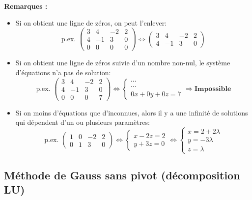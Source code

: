 \textbf{Remarques :}
\begin{itemize}
\item Si on obtient une ligne de zéros, on peut l'enlever:
\[\text{p.ex. }  \left(\begin{array}{ccc|c} 3 & 4 & -2 & 2 \\ 4 & -1 & 3 & 0 \\ 0 & 0 & 0 & 0 \end{array}\right) \Leftrightarrow  \left(\begin{array}{ccc|c} 3 & 4 & -2 & 2 \\ 4 & -1 & 3 & 0 \end{array}\right) \]
\item Si on obtient une ligne de zéros suivie d'un nombre non-nul, le système d'équations n'a pas de solution:
\[\text{p.ex. }  \left(\begin{array}{ccc|c} 3 & 4 & -2 & 2 \\ 4 & -1 & 3 & 0 \\ 0 & 0 & 0 & 7 \end{array}\right) \Leftrightarrow  \begin{cases} \cdots \\ \cdots \\ 0x + 0y + 0z = 7 \end{cases} \Rightarrow \textbf{Impossible} \]
\item Si on moins d'équations que d'inconnues, alors il y a une infinité de solutions qui dépendent d'un ou plusieurs paramètres:
\[\text{p.ex. }  \left(\begin{array}{ccc|c} 1 & 0 & -2 & 2 \\ 0 & 1 & 3 & 0 \end{array}\right) \Leftrightarrow  \begin{cases} x - 2z = 2 \\ y + 3z = 0 \end{cases} \Leftrightarrow  \begin{cases} x = 2 + 2\lambda \\ y = -3\lambda \\ z = \lambda \end{cases} \]
\end{itemize}

\subsection{Méthode de Gauss sans pivot (décomposition LU)}

